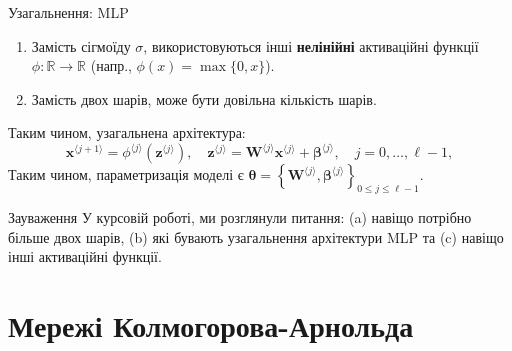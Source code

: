 \documentclass{zkdl-presentation-template}
\begin{document}
    \begin{frame}{Узагальнення: MLP}
        \begin{enumerate}
            \item Замість сігмоїду $\sigma$, використовуються інші \textbf{нелінійні}
            активаційні функції $\phi: \mathbb{R} \to \mathbb{R}$ (напр., $\phi(x) = \max\{0,x\}$).
            \item Замість двох шарів, може бути довільна кількість шарів.
        \end{enumerate}

        \begin{definition}\label{def:mlp}
            Таким чином, узагальнена архітектура:
            \begin{equation*}
                \boldsymbol{x}^{\langle j+1 \rangle} = \phi^{\langle j \rangle}(\boldsymbol{z}^{\langle j \rangle}), \quad \boldsymbol{z}^{\langle j \rangle} = \boldsymbol{W}^{\langle j \rangle}\boldsymbol{x}^{\langle j \rangle} + \boldsymbol{\beta}^{\langle j \rangle}, \quad j = 0,\dots,\ell-1,
            \end{equation*}
            Таким чином, параметризація моделі є $\boldsymbol{\theta} =
            \left\{\boldsymbol{W}^{\langle j \rangle},\boldsymbol{\beta}^{\langle j
            \rangle}\right\}_{0 \leq j \leq \ell-1}$.
        \end{definition}

        \begin{alertblock}{Зауваження}
            У курсовій роботі, ми розглянули питання: (a) навіщо потрібно більше двох шарів, (b) які бувають узагальнення архітектури MLP та (c) навіщо інші активаційні функції.
        \end{alertblock}
    \end{frame}

    \section{Мережі Колмогорова-Арнольда}
\end{document}
